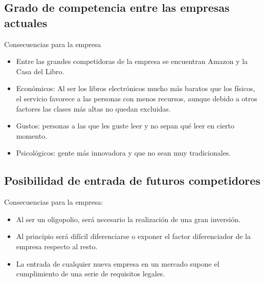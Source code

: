 \documentclass[openany,overnay,a4paper, twoside, 12pt]{book}
\begin{document}
\subsection{Grado de competencia entre las empresas actuales}
Consecuencias para la empresa
\begin{itemize}
\item Entre las grandes competidoras de la empresa se encuentran Amazon y la Casa del Libro.
\item Económicos: Al ser los libros electrónicos mucho más baratos que los físicos, el servicio favorece a las personas con menos recursos, aunque debido a otros factores las clases más altas no quedan excluidas. 
\item Gustos: personas a las que les guste leer y no sepan qué leer en cierto momento.
\item Psicológicos: gente más innovadora y que no sean muy tradicionales.
\end{itemize}
\subsection{Posibilidad de entrada de futuros competidores}
Consecuencias para la empresa:
\begin{itemize}
\item Al ser un oligopolio, será necesario la realización de una gran inversión.
\item Al principio será difícil diferenciarse o exponer el factor diferenciador de la empresa respecto al resto. 
\item La entrada de cualquier nueva empresa en un mercado supone el cumplimiento de una serie de requisitos legales.
\end{itemize}
\end{document}
